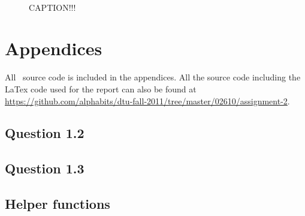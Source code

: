 \begin{figure}
    \mbox{\vspace{5mm}}
    \mbox{   \quad 
            }
    \caption{CAPTION!!!}
    \label{fig:ex13}
\end{figure}

\pagebreak
\renewcommand\thesection{\Alph{section}}


\section{Appendices}

All \matlab\ source code is included in the appendices. All the source code
including the LaTex code used for the report can also be found at
\url{https://github.com/alphabits/dtu-fall-2011/tree/master/02610/assignment-2}.

\subsection{Question 1.2}\label{app:ex12}


\subsection{Question 1.3}\label{app:ex13}


\subsection{Helper functions}\label{app:helpers}



\pagebreak



